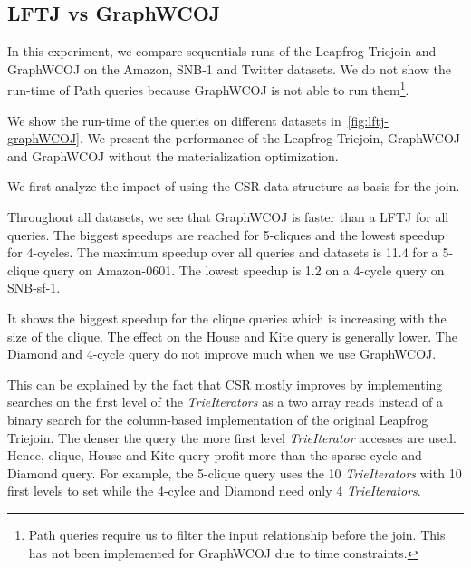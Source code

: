 %
%    
%
%    
%
%    

\subsection{\textsc{LFTJ} vs GraphWCOJ} \label{subsec:lftj-vs-graphWCOJ}

In this experiment, we compare sequentials runs of the Leapfrog Triejoin and GraphWCOJ
on the Amazon, SNB-1 and Twitter datasets.
We do not show the run-time of Path queries because GraphWCOJ is not able to run
them\footnote{Path queries require us to filter the input relationship before
the join. This has not been implemented for GraphWCOJ due to time constraints.}.

We show the run-time of the queries on different datasets in~\cref{fig:lftj-graphWCOJ}.
We present the performance of the Leapfrog Triejoin, GraphWCOJ and GraphWCOJ without the
materialization optimization.

We first analyze the impact of using the \textsc{CSR} data structure as basis for the join.

Throughout all datasets, we see that GraphWCOJ is faster than a \textsc{LFTJ} for all queries.
The biggest speedups are reached for 5-cliques and the lowest speedup for 4-cycles.
The maximum speedup over all queries and datasets is 11.4 for a 5-clique query on Amazon-0601.
The lowest speedup is 1.2 on a 4-cycle query on SNB-sf-1.

It shows the biggest speedup for the clique queries which is increasing with the size of the clique.
The effect on the House and Kite query is generally lower.
The Diamond and 4-cycle query do not improve much when we use GraphWCOJ.

This can be explained by the fact that \textsc{CSR} mostly improves by implementing searches on
the first level of the \textit{TrieIterators} as a two array reads instead of a binary search for
the column-based implementation of the original Leapfrog Triejoin.
The denser the query the more first level \textit{TrieIterator} accesses are used.
Hence, clique, House and Kite query profit more than the sparse cycle and Diamond query.
For example, the 5-clique query uses the 10 \textit{TrieIterators} with 10 first levels to set while
the 4-cylce and Diamond need only 4 \textit{TrieIterators}.

